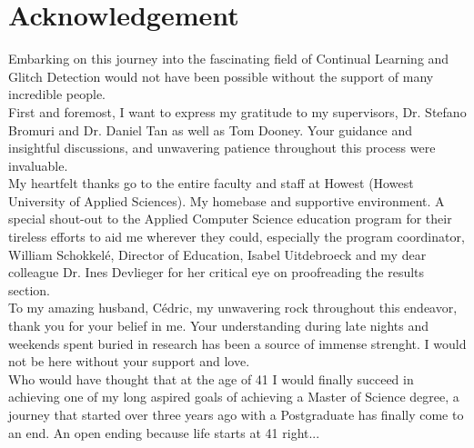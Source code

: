 \section*{Acknowledgement}
Embarking on this journey into the fascinating field of Continual Learning and Glitch Detection would not have been possible without the support of many incredible people. \\

First and foremost, I want to express my gratitude to my supervisors, Dr. Stefano Bromuri and Dr. Daniel Tan as well as Tom Dooney. Your guidance and insightful discussions, and unwavering patience throughout this process were invaluable. \\

My heartfelt thanks go to the entire faculty and staff at Howest (Howest University of Applied Sciences). My homebase and supportive environment. A special shout-out to the Applied Computer Science education program for their tireless efforts to aid me wherever they could, especially the program coordinator, William Schokkelé, Director of Education, Isabel Uitdebroeck and my dear colleague Dr. Ines Devlieger for her critical eye on proofreading the results section. \\

To my amazing husband, Cédric, my unwavering rock throughout this endeavor, thank you for your belief in me. Your understanding during late nights and weekends spent buried in research has been a source of immense strenght. I would not be here without your support and love.\\

Who would have thought that at the age of 41 I would finally succeed in achieving one of my long aspired goals of achieving a Master of Science degree, a journey that started over three years ago with a Postgraduate has finally come to an end. An open ending because life starts at 41 right...\\

